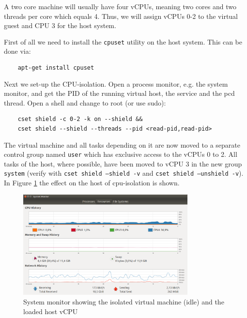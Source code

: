 \documentclass[]{scrartcl}
\begin{document}
A two core machine will usually have four vCPUs, meaning two cores and two threads per core which equals 4. Thus, we will assign vCPUs 0-2 to the virtual guest and CPU 3 for the host system.

First of all we need to install the \texttt{cpuset} utility on the host system. This can be done via:

\begin{verbatim}
	apt-get install cpuset
\end{verbatim}

Next we set-up the CPU-isolation. Open a process monitor, e.g. the system monitor, and get the PID of the running virtual host, the service and the pcd thread. Open a shell and change to root (or use sudo):

\begin{verbatim}
	cset shield -c 0-2 -k on --shield &&
	cset shield --shield --threads --pid <read-pid,read-pid>
\end{verbatim}

The virtual machine and all tasks depending on it are now moved to a separate control group named \texttt{user} which has exclusive access to the vCPUs 0 to 2. All tasks of the host, where possible, have been moved to vCPU 3 in the new group \texttt{system} (verify with \texttt{cset shield --shield -v} and \texttt{cset shield --unshield -v}). In Figure \ref{fig:test-cpu} the effect on the host of cpu-isolation is shown.

\begin{figure}[t]
	\centering
	\includegraphics[width=0.8\textwidth]{test-cpu}
	\caption{System monitor showing the isolated virtual machine (idle) and the loaded host vCPU}
	\label{fig:test-cpu}
\end{figure}
\bigskip

\end{document}
